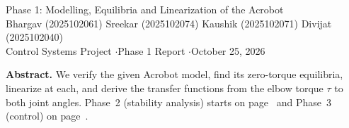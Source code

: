 \documentclass[10pt,letterpaper]{article}
\begin{document}
\begin{center}
\begin{singlespace}
{\fontsize{17}{20}\selectfont Phase 1: Modelling, Equilibria and Linearization of the Acrobot}\\[4pt]
{\small Bhargav (2025102061) \quad Sreekar (2025102074) \quad Kaushik (2025102071) \quad Divijat (2025102040)}\\[1pt]
{\footnotesize Control Systems Project \quad$\cdot$\quad Phase 1 Report \quad$\cdot$\quad October 25, 2026}
\end{singlespace}
\end{center}
\vspace{-6pt}
{\small\textbf{Abstract.} We verify the given Acrobot model, find its zero-torque equilibria, linearize at each, and derive the transfer functions from the elbow torque $\tau$ to both joint angles. Phase~2 (stability analysis) starts on page~\pageref{phase2} and Phase~3 (control) on page~\pageref{phase3}.\par}

\end{document}
